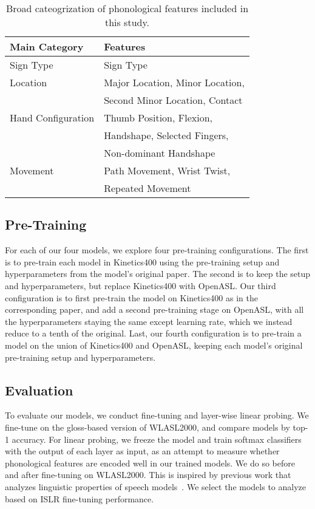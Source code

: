 \begin{table}[]
\centering
\begin{tabular}{ll}
\hline
\textbf{Main Category} & \textbf{Features} \\
\hline
Sign Type & Sign Type \\
\hline
Location & Major Location, Minor Location, \\
  &Second Minor Location, Contact \\
\hline
Hand Configuration & Thumb Position, Flexion, \\
  &Handshape, Selected Fingers, \\
    & Non-dominant Handshape \\
\hline
Movement & Path Movement, Wrist Twist, \\
  & Repeated Movement \\
\hline
\end{tabular}
\caption{Broad cateogrization of phonological features included in this study.}
\label{tab:phono-categorization}
\end{table}

\subsection{Pre-Training}
\label{sec:experimental-setup-pretraining}

For each of our four models, we explore four pre-training configurations. The first is to pre-train each model in Kinetics400 using the pre-training setup and hyperparameters from the model's original paper. The second is to keep the setup and hyperparameters, but replace Kinetics400 with OpenASL. Our third configuration is to first pre-train the model on Kinetics400 as in the corresponding paper, and add a second pre-training stage on OpenASL, with all the hyperparameters staying the same except learning rate, which we instead reduce to a tenth of the original. Last, our fourth configuration is to pre-train a model on the union of Kinetics400 and OpenASL, keeping each model's original pre-training setup and hyperparameters.


\subsection{Evaluation}
\label{sec:experimental-setup-evaluation}

To evaluate our models, we conduct fine-tuning and layer-wise linear probing. We fine-tune on the gloss-based version of WLASL2000, and compare models by top-1 accuracy. For linear probing, we freeze the model and train softmax classifiers with the output of each layer as input, as an attempt to measure whether phonological features are encoded well in our trained models. We do so before and after fine-tuning on WLASL2000. This is inspired by previous work that analyzes linguistic properties of speech models~\cite{pasad2021layer,ji2022predicting,pasad2023comparative}. We select the models to analyze based on ISLR fine-tuning performance.
